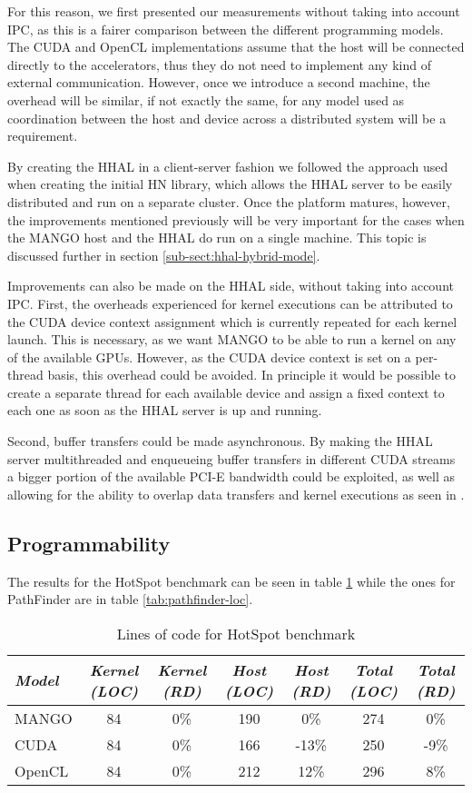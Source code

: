 For this reason, we first presented our measurements without taking into account IPC, as this is a fairer comparison between the different programming models. The CUDA and OpenCL implementations assume that the host will be connected directly to the accelerators, thus they do not need to implement any kind of external communication. However, once we introduce a second machine, the overhead will be similar, if not exactly the same, for any model used as coordination between the host and device across a distributed system will be a requirement.

By creating the HHAL in a client-server fashion we followed the approach used when creating the initial HN library, which allows the HHAL server to be easily distributed and run on a separate cluster. Once the platform matures, however, the improvements mentioned previously will be very important for the cases when the MANGO host and the HHAL do run on a single machine. This topic is discussed further in section \ref{sub-sect:hhal-hybrid-mode}.

Improvements can also be made on the HHAL side, without taking into account IPC. First, the overheads experienced for kernel executions can be attributed to the CUDA device context assignment which is currently repeated for each kernel launch. This is necessary, as we want MANGO to be able to run a kernel on any of the available GPUs. However, as the CUDA device context is set on a per-thread basis, this overhead could be avoided. In principle it would be possible to create a separate thread for each available device and assign a fixed context to each one as soon as the HHAL server is up and running.

Second, buffer transfers could be made asynchronous. By making the HHAL server multithreaded and enqueueing buffer transfers in different CUDA streams a bigger portion of the available PCI-E bandwidth could be exploited, as well as allowing for the ability to overlap data transfers and kernel executions as seen in \cite{overlap-data-transfers-cuda}.

\subsection{Programmability}

The results for the HotSpot benchmark can be seen in table \ref{tab:hotspot-loc} while the ones for PathFinder are in table \ref{tab:pathfinder-loc}.

\begin{table}
    \centering
    \begin{tabular}{l|c|c|c|c|c|c}
    \textit{Model} & \textit{Kernel (LOC)} & \textit{Kernel (RD)} & \textit{Host (LOC)} & \textit{Host (RD)} & \textit{Total (LOC)} & \textit{Total (RD)} \\ \hline
    MANGO & 84 & 0\% & 190 & 0\% & 274 & 0\% \\
    CUDA & 84 & 0\% & 166 & -13\% & 250 & -9\% \\
    OpenCL & 84 & 0\% & 212 & 12\% & 296 & 8\%  
    \end{tabular}
    \captionsetup{justification=centering}
    \caption{Lines of code for HotSpot benchmark}
    \label{tab:hotspot-loc}
\end{table}

